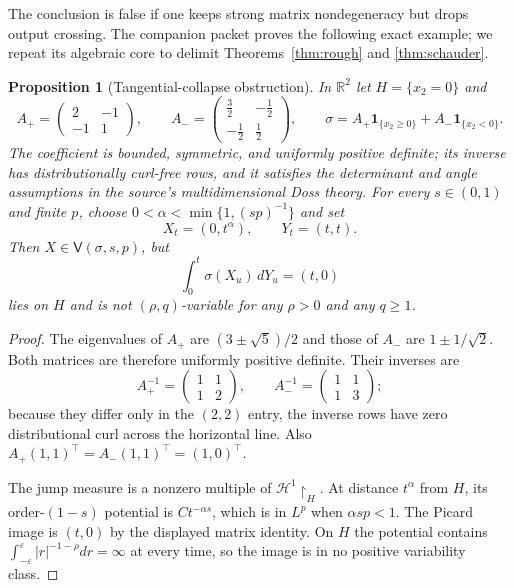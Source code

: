 \documentclass[11pt]{article}
\newtheorem{proposition}{Proposition}
\newcommand{\R}{\mathbb{R}}
\newcommand{\HH}{\mathcal{H}}
\newcommand{\V}{\mathsf{V}}
\begin{document}
The conclusion is false if one keeps strong matrix nondegeneracy but drops
output crossing.  The companion packet proves the following exact example;
we repeat its algebraic core to delimit Theorems~\ref{thm:rough} and
\ref{thm:schauder}.

\begin{proposition}[Tangential-collapse obstruction]\label{prop:obstruction}
In $\R^2$ let $H=\{x_2=0\}$ and
\[
 A_+=\begin{pmatrix}2&-1\\-1&1\end{pmatrix},\qquad
 A_-=\begin{pmatrix}\frac32&-\frac12\\-\frac12&\frac12\end{pmatrix},
 \qquad
 \sigma=A_+\mathbf1_{\{x_2\geq0\}}+A_-\mathbf1_{\{x_2<0\}}.
\]
The coefficient is bounded, symmetric, and uniformly positive definite; its
inverse has distributionally curl-free rows, and it satisfies the determinant
and angle assumptions in the source's multidimensional Doss theory.  For every
$s\in(0,1)$ and finite $p$, choose
$0<\alpha<\min\{1,(sp)^{-1}\}$ and set
\[
 X_t=(0,t^\alpha),\qquad Y_t=(t,t).
\]
Then $X\in\V(\sigma,s,p)$, but
\[
 \int_0^t\sigma(X_u)\,dY_u=(t,0)
\]
lies on $H$ and is not $(\rho,q)$-variable for any $\rho>0$ and any
$q\geq1$.
\end{proposition}

\begin{proof}
The eigenvalues of $A_+$ are $(3\pm\sqrt5)/2$ and those of $A_-$ are
$1\pm1/\sqrt2$.  Both matrices are therefore uniformly positive definite.
Their inverses are
\[
 A_+^{-1}=\begin{pmatrix}1&1\\1&2\end{pmatrix},\qquad
 A_-^{-1}=\begin{pmatrix}1&1\\1&3\end{pmatrix};
\]
because they differ only in the $(2,2)$ entry, the inverse rows have zero
distributional curl across the horizontal line.  Also
$A_+(1,1)^\top=A_-(1,1)^\top=(1,0)^\top$.

The jump measure is a nonzero multiple of $\HH^1\restriction_H$.  At distance
$t^\alpha$ from $H$, its order-$(1-s)$ potential is $Ct^{-\alpha s}$, which is
in $L^p$ when $\alpha sp<1$.  The Picard image is $(t,0)$ by the displayed
matrix identity.  On $H$ the potential contains
$\int_{-\varepsilon}^{\varepsilon}|r|^{-1-\rho}dr=\infty$ at every time,
so the image is in no positive variability class.
\end{proof}
\end{document}
